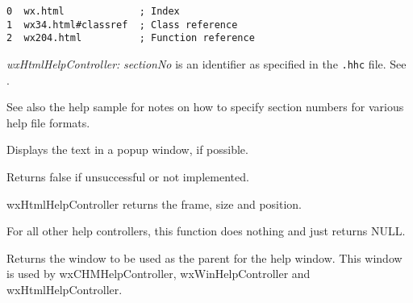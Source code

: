 \begin{verbatim}
0  wx.html             ; Index
1  wx34.html#classref  ; Class reference
2  wx204.html          ; Function reference
\end{verbatim}

{\it wxHtmlHelpController:} {\it sectionNo} is an identifier as specified in the {\tt .hhc} file. See .

See also the help sample for notes on how to specify section numbers for various help file formats.

\label{wxhelpcontrollerdisplaytextpopup}


Displays the text in a popup window, if possible.

Returns false if unsuccessful or not implemented.

\label{wxhelpcontrollergetframeparameters}


wxHtmlHelpController returns the frame, size and position.

For all other help controllers, this function does nothing
and just returns NULL.




\label{wxhelpcontrollergetparentwindow}


Returns the window to be used as the parent for the help window. This window is used
by wxCHMHelpController, wxWinHelpController and wxHtmlHelpController.

\label{wxhelpcontrollerkeywordsearch}


